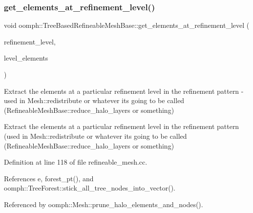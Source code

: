 \mbox{\label{classoomph_1_1TreeBasedRefineableMeshBase_a65912e0ba140a141ef082639730aeb18}} 
\subsubsection{\texorpdfstring{get\+\_\+elements\+\_\+at\+\_\+refinement\+\_\+level()}{get\_elements\_at\_refinement\_level()}}
{\footnotesize\ttfamily void oomph\+::\+Tree\+Based\+Refineable\+Mesh\+Base\+::get\+\_\+elements\+\_\+at\+\_\+refinement\+\_\+level (\begin{DoxyParamCaption}\item[{unsigned \&}]{refinement\+\_\+level,  }\item[{\hyperlink{classoomph_1_1Vector}{Vector}$<$ \hyperlink{classoomph_1_1RefineableElement}{Refineable\+Element} $\ast$$>$ \&}]{level\+\_\+elements }\end{DoxyParamCaption})\hspace{0.3cm}{\ttfamily [virtual]}}



Extract the elements at a particular refinement level in the refinement pattern -\/ used in Mesh\+::redistribute or whatever it\textquotesingle{}s going to be called (Refineable\+Mesh\+Base\+::reduce\+\_\+halo\+\_\+layers or something) 

Extract the elements at a particular refinement level in the refinement pattern (used in Mesh\+::redistribute or whatever it\textquotesingle{}s going to be called (Refineable\+Mesh\+Base\+::reduce\+\_\+halo\+\_\+layers or something) 

Definition at line 118 of file refineable\+\_\+mesh.\+cc.



References e, forest\+\_\+pt(), and oomph\+::\+Tree\+Forest\+::stick\+\_\+all\+\_\+tree\+\_\+nodes\+\_\+into\+\_\+vector().



Referenced by oomph\+::\+Mesh\+::prune\+\_\+halo\+\_\+elements\+\_\+and\+\_\+nodes().

